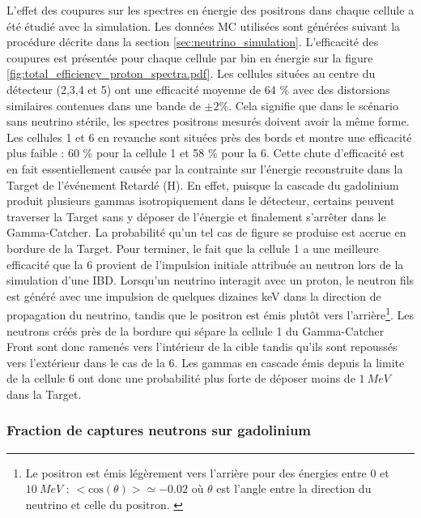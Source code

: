 L'effet des coupures sur les spectres en énergie des positrons dans chaque cellule a été étudié avec la simulation. Les données MC utilisées sont générées suivant la procédure décrite dans la section \ref{sec:neutrino_simulation}. L'efficacité des coupures est présentée pour chaque cellule par bin en énergie sur la figure \ref{fig:total_efficiency_proton_spectra.pdf}. Les cellules situées au centre du détecteur (2,3,4 et 5) ont une efficacité moyenne de 64 \% avec des distorsions similaires contenues dans une bande de $\pm 2\%$. Cela signifie que dans le scénario sans neutrino stérile, les spectres positrons mesurés doivent avoir la même forme. Les cellules 1 et 6 en revanche sont situées près des bords et montre une efficacité plus faible : 60 \% pour la cellule 1 et 58 \% pour la 6. Cette chute d'efficacité est en fait essentiellement causée par la contrainte sur l'énergie reconstruite dans la Target de l'événement Retardé (H). En effet, puisque la cascade du gadolinium produit plusieurs gammas isotropiquement dans le détecteur, certains peuvent traverser la Target sans y déposer de l'énergie et finalement s'arrêter dans le Gamma-Catcher. La probabilité qu'un tel cas de figure se produise est accrue en bordure de la Target. Pour terminer, le fait que la cellule 1 a une meilleure efficacité que la 6 provient de l'impulsion initiale attribuée au neutron lors de la simulation d'une IBD. Lorsqu'un neutrino interagit avec un proton, le neutron fils est généré avec une impulsion de quelques dizaines keV dans la direction de propagation du neutrino, tandis que le positron est émis plutôt vers l'arrière\footnote{Le positron est émis légèrement vers l'arrière pour des énergies entre 0 et $\SI{10}{MeV}$ : $<\textrm{cos}(\theta)> \simeq -0.02$ où $\theta$ est l'angle entre la direction du neutrino et celle du positron. \cite{Vogel:1999zy}}. Les neutrons créés près de la bordure qui sépare la cellule 1 du Gamma-Catcher Front sont donc ramenés vers l'intérieur de la cible tandis qu'ils sont repoussés vers l'extérieur dans le cas de la 6. Les gammas en cascade émis depuis la limite de la cellule 6 ont donc une probabilité plus forte de déposer moins de $\SI{1}{MeV}$ dans la Target.

\bigbreak

\subsubsection*{Fraction de captures neutrons sur gadolinium}

